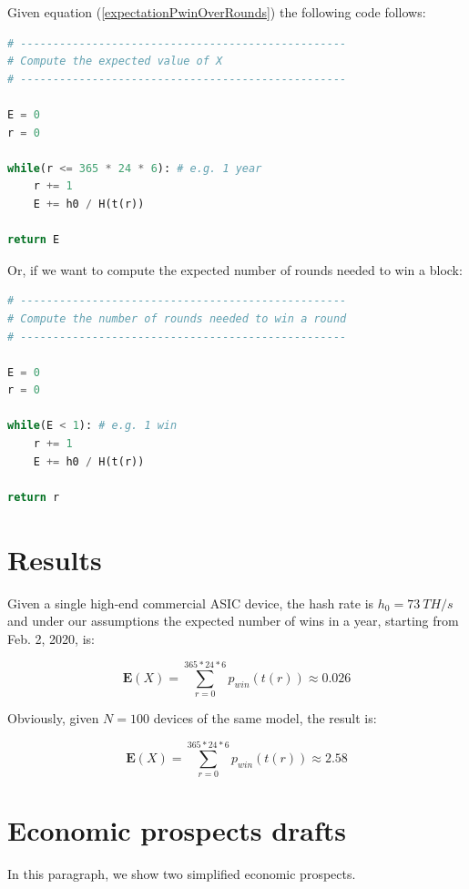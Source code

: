 \documentclass{article}
\begin{document}
Given equation (\ref{expectationPwinOverRounds}) the following code follows:

\begin{lstlisting}[language=Python]
# --------------------------------------------------
# Compute the expected value of X
# --------------------------------------------------

E = 0
r = 0

while(r <= 365 * 24 * 6): # e.g. 1 year
    r += 1
    E += h0 / H(t(r))

return E
\end{lstlisting}

Or, if we want to compute the expected number of rounds needed to win a block:

\begin{lstlisting}[language=Python]
# --------------------------------------------------
# Compute the number of rounds needed to win a round
# --------------------------------------------------

E = 0
r = 0

while(E < 1): # e.g. 1 win
    r += 1
    E += h0 / H(t(r))

return r
\end{lstlisting}

\section{Results}

Given a single high-end commercial ASIC device, the hash rate is $h_{0} = 73\ TH/s$ and under our assumptions
the expected number of wins in a year, starting from Feb. 2, 2020, is:

\begin{equation}
    \mathbf{E}(X) = \displaystyle\sum_{r=0}^{365*24*6} p_{win}(t(r)) \approx 0.026 \label{res1}
\end{equation}

Obviously, given $N=100$ devices of the same model, the result is:

\begin{equation}
    \mathbf{E}(X) = \displaystyle\sum_{r=0}^{365*24*6} p_{win}(t(r)) \approx 2.58 \label{res11}
\end{equation}

\section{Economic prospects drafts}

In this paragraph, we show two simplified economic prospects.
\end{document}
